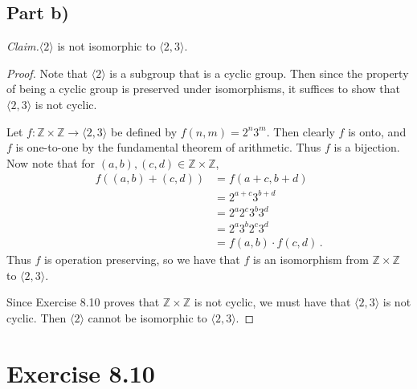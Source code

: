 \documentclass{abrice}
\newcommand{\Z}{\mathbb{Z}}
\newcommand{\Claim}{\emph{Claim.}\xspace}%
\begin{document}
\subsection{Part b)}

\Claim $\langle 2 \rangle$ is not isomorphic to $\langle 2,3 \rangle$.

\begin{proof}

  Note that $\langle 2 \rangle$ is a subgroup that is a cyclic group. Then since
  the property of being a cyclic group is preserved under isomorphisms, it
  suffices to show that $\langle 2, 3 \rangle$ is not cyclic.

  Let $f : \Z \times \Z \to \langle 2,3 \rangle$ be defined by $f(n,m) = 2^n
  3^m$. Then clearly $f$ is onto, and $f$ is one-to-one by the fundamental
  theorem of arithmetic. Thus $f$ is a bijection. Now note that for $(a,b),(c,d)
  \in \Z \times \Z$,
  \begin{align*}
    f((a,b) + (c,d))
    &= f(a+c, b + d) \\
    &= 2^{a+c} 3^{b+d} \\
    &= 2^a 2^c 3^b 3^d \\
    &= 2^a 3^b 2^c 3^d \\
    &= f(a,b) \cdot f(c,d)\, .
  \end{align*}
  Thus $f$ is operation preserving, so we have that $f$ is an isomorphism from
  $\Z \times \Z$ to $\langle 2,3 \rangle$.

  Since Exercise 8.10 proves that $\Z \times \Z$ is not cyclic, we must have
  that $\langle 2,3 \rangle$ is not cyclic. Then $\langle 2 \rangle$ cannot be
  isomorphic to $\langle 2,3 \rangle$.
\end{proof}

\section{Exercise 8.10}
\end{document}
